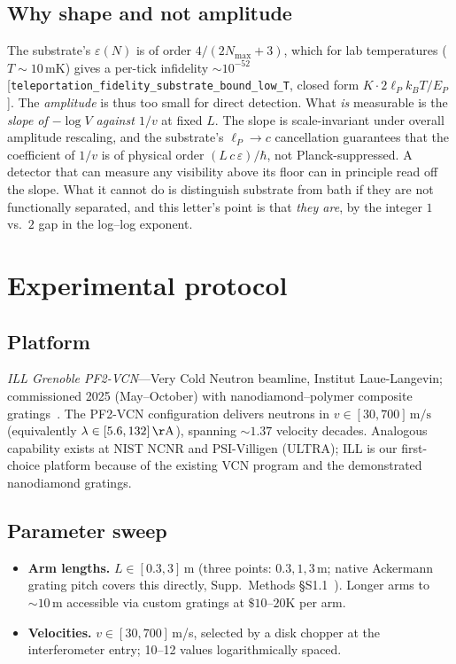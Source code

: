\documentclass[aps,prl,twocolumn,superscriptaddress,nofootinbib,10pt]{revtex4-2}
\newcommand{\lP}{\ell_P}
\newcommand{\EP}{E_P}
\newcommand{\eps}{\varepsilon}
\newcommand{\Nmax}{N_{\max}}
\begin{document}
\subsection{Why shape and not amplitude}
The substrate's $\eps(N)$ is of order $4/(2\Nmax+3)$, which for
lab temperatures ($T\sim 10\,$mK) gives a per-tick infidelity
$\sim 10^{-52}$ [\texttt{teleportation\_fidelity\_substrate\_bound\_low\_T},
closed form $K\cdot 2\lP k_B T/\EP$]. The \emph{amplitude} is thus
too small for direct detection.  What \emph{is} measurable is the
\emph{slope of $-\log V$ against $1/v$} at fixed $L$.  The slope is
scale-invariant under overall amplitude rescaling, and the substrate's
$\lP \to c$ cancellation guarantees that the coefficient of $1/v$ is
of physical order $(L\,c\,\eps)/\hbar$, not Planck-suppressed.  A
detector that can measure any visibility above its floor can in
principle read off the slope.  What it cannot do is distinguish
substrate from bath if they are not functionally separated, and this
letter's point is that \emph{they are}, by the integer $1$ vs.\ $2$
gap in the log--log exponent.

\section{Experimental protocol}

\subsection{Platform}
\emph{ILL Grenoble PF2-VCN}---Very Cold Neutron beamline, Institut
Laue-Langevin; commissioned 2025 (May--October) with
nanodiamond--polymer composite gratings~\cite{Ackermann2026VCN}.  The
PF2-VCN configuration delivers neutrons in $v \in [30, 700]\,\mathrm{m/s}$
(equivalently $\lambda \in [5.6, 132]\,\mathrm{\AA}$), spanning $\sim 1.37$
velocity decades.  Analogous capability exists at NIST NCNR and
PSI-Villigen (ULTRA); ILL is our first-choice platform because of
the existing VCN program and the demonstrated nanodiamond gratings.

\subsection{Parameter sweep}
\begin{itemize}\itemsep0pt
  \item \textbf{Arm lengths.} $L \in [0.3, 3]\,$m (three points:
  $0.3, 1, 3\,$m; native Ackermann grating pitch covers this
  directly, Supp.~Methods \S S1.1~\cite{Alnitak2026Supp}). Longer
  arms to $\sim 10\,$m accessible via custom gratings at
  $\$10$--$20$K per arm.
  \item \textbf{Velocities.} $v \in [30, 700]\,$m/s, selected by a
  disk chopper at the interferometer entry; 10--12 values
  logarithmically spaced.
\end{itemize}
\end{document}

